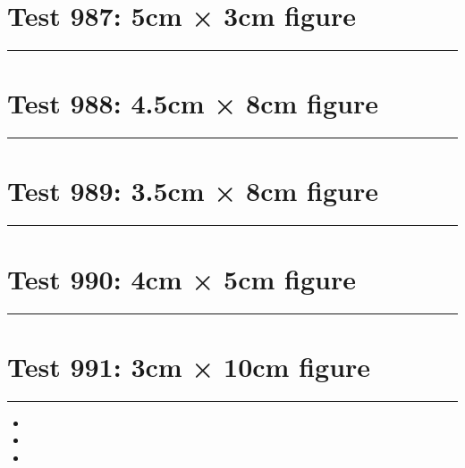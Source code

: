 \documentclass[a4paper,11pt]{article}
\begin{document}
\section*{Test 987: 5cm × 3cm figure}
\begin{swarmwrap}%
  \begin{minipage}[t]{5cm}
    \centering
    \rule{\linewidth}{3cm}
  \end{minipage}%
\end{swarmwrap}%
\swarmwrapnext
\lipsum[113]
\lipsum[114]
\lipsum[115]
\lipsum[116]
\section*{Test 988: 4.5cm × 8cm figure}
\begin{swarmwrap}%
  \begin{minipage}[t]{4cm}
    \centering
    \rule{\linewidth}{8cm}
  \end{minipage}%
\end{swarmwrap}%
\swarmwrapnext
\lipsum[111]
\lipsum[112]
\lipsum[113]
\lipsum[114]
\lipsum[115]
\lipsum[116]
\section*{Test 989: 3.5cm × 8cm figure}
\begin{swarmwrap}%
  \begin{minipage}[t]{3cm}
    \centering
    \rule{\linewidth}{8cm}
  \end{minipage}%
\end{swarmwrap}%
\swarmwrapnext
\lipsum[11]
\lipsum[12]
\lipsum[13]
\section*{Test 990: 4cm × 5cm figure}
\begin{swarmwrap}%
  \begin{minipage}[t]{4cm}
    \centering
    \rule{\linewidth}{5cm}
  \end{minipage}%
\end{swarmwrap}%
\swarmwrapnext
\lipsum[5]
\lipsum[6]
\lipsum[7]
\lipsum[8]
\lipsum[9]
\section*{Test 991: 3cm × 10cm figure}
\begin{swarmwrap}%
  \begin{minipage}[t]{3cm}
    \centering
    \rule{\linewidth}{10cm}
  \end{minipage}%
\end{swarmwrap}
\begin{itemize}
  \item \swarmwrapnext\lipsum[5][1-4]
  \item \lipsum[7][1-3]
  \item \lipsum[8][1-3]
\end{itemize}
\end{document}
